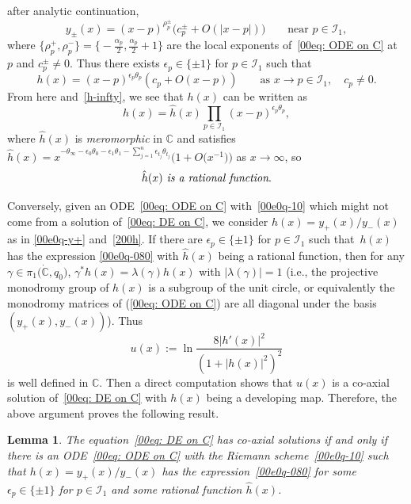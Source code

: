 \documentclass[pdftex]{sigma}
\numberwithin{equation}{section}
\newtheorem{Lemma}[Theorem]{Lemma}
\begin{document}
 after analytic continuation,
 \[y_{\pm}(x)=(x-p)^{\rho_p^{\pm}}\bigl(c_p^{\pm}+O(|x-p|)\bigr)\qquad \text{near }p\in \mathcal{I}_1,\]
 where
 $\{\rho_p^{+},\rho_p^{-}\}=\bigl\{-\frac{\alpha_p}{2},\frac{\alpha_p}{2}+1\bigr\}$
 are the local exponents of~\eqref{00eq: ODE on C} at $p$ and
 $c_p^{\pm}\neq 0$.
Thus there exists $\epsilon_p\in\{\pm 1\}$ for $p\in \mathcal{I}_1$ such that
\[h(x)=(x-p)^{\epsilon_p\theta_p}(c_p+O(x-p))\qquad \text{as }x\to p\in \mathcal{I}_1,\quad c_p\neq 0.\]
From here and~\eqref{h-infty}, we see that $h(x)$ can be written as
\begin{equation}\label{00e0q-080}
 h(x)=\hat{h}(x)\prod_{p\in \mathcal{I}_1}(x-p)^{\epsilon_{p}\theta_{p}},
\end{equation}
where $\hat{h}(x)$ is \emph{meromorphic} in $\mathbb{C}$ and satisfies $\hat{h}(x)=x^{-\theta_\infty-\epsilon_0\theta_0-\epsilon_1\theta_1-\sum_{j=1}^n\epsilon_{t_j}\theta_{t_j}}\bigl(1+O\bigl(x^{-1}\bigr)\bigr)$ as $x\to\infty$, so
\begin{equation}\label{hhat}\emph{$\hat{h}(x)$ is a rational function}.\end{equation}

Conversely, given an ODE~\eqref{00eq: ODE on C} with~\eqref{00e0q-10}
which might not come from a solution of~\eqref{00eq: DE on C}, we
consider $h(x)=y_{+}(x)/y_{-}(x)$ as in
\eqref{00e0q-y+} and~\eqref{200h}. If there are $\epsilon_p\in\{\pm 1\}$
for $p\in \mathcal{I}_1$ such that~$h(x)$ has the expression
\eqref{00e0q-080} with $\hat h(x)$ being a rational function, then for
any $\gamma\in\pi_1\bigl(\dot{\mathbb{C}},q_0\bigr)$,
$\gamma^*h(x)=\lambda(\gamma)h(x)$ with $|\lambda(\gamma)|=1$
(i.e., the projective monodromy group of $h(x)$ is a subgroup of the
unit circle, or equivalently the monodromy matrices of (\ref{00eq: ODE
 on C}) are all diagonal under the basis $(y_{+}(x),
y_{-}(x))$). Thus
\[u(x):=\ln\frac{8|h'(x)|^2}{(1+|h(x)|^2)^2}\]
is well defined in $\mathbb{C}$. Then a direct computation shows that $u(x)$ is a co-axial solution of~\eqref{00eq: DE on C} with $h(x)$ being a developing map. Therefore, the above argument proves the following result.

\begin{Lemma}\label{lemm3-1}
 The equation~\eqref{00eq: DE on C} has co-axial solutions if and
 only if there is an ODE~\eqref{00eq: ODE on C} with the Riemann
 scheme~\eqref{00e0q-10} such that
 $h(x)=y_{+}(x)/y_{-}(x)$ has the expression~\eqref{00e0q-080} for
 some $\epsilon_p\in\{\pm 1\}$ for $p\in \mathcal{I}_1$ and some
 rational function $\hat{h}(x)$.
\end{Lemma}
\end{document}

